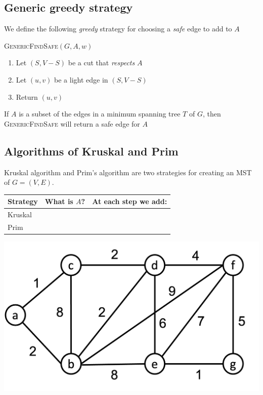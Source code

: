 \documentclass[11  pt]{exam}
\begin{document}
\newpage
\subsection{Generic greedy strategy}
We define the following \emph{greedy} strategy for choosing a \emph{safe} edge to add to $A$

\textsc{GenericFindSafe}$(G,A,w)$
\begin{enumerate}
	\item Let $(S, V-S)$ be a cut that \emph{respects} $A$
	\item Let $(u,v)$ be a light edge in $(S, V-S)$
	\item Return $(u,v)$
\end{enumerate}
\begin{lemma}
	If $A$ is a subset of the edges in a minimum spanning tree $T$ of $G$, then \textsc{GenericFindSafe} will return a safe edge for $A$
\end{lemma}


\newpage

\subsection{Algorithms of Kruskal and Prim}
Kruskal algorithm and Prim's algorithm are two strategies for creating an MST of $G = (V,E)$.\\

\begin{tabular}{| l | p{7cm} | p{6cm} |}
	\hline
	\textbf{Strategy} & \textbf{What is $A$?} & At each step we add: \\
	\hline
	Kruskal &  \phantom{least weight edge connecting two components} & \phantom{least weight edge connecting two components} \phantom{more of the same stuff right here} \\
	\hline
	Prim & & \phantom{least weight edge connecting tree to another previously unconnected node} \phantom{more of the same stuff right here}\\
	\hline
\end{tabular}

\begin{center}
	\includegraphics[width = .75\linewidth]{mst-graph.png}
\end{center}
\end{document}
